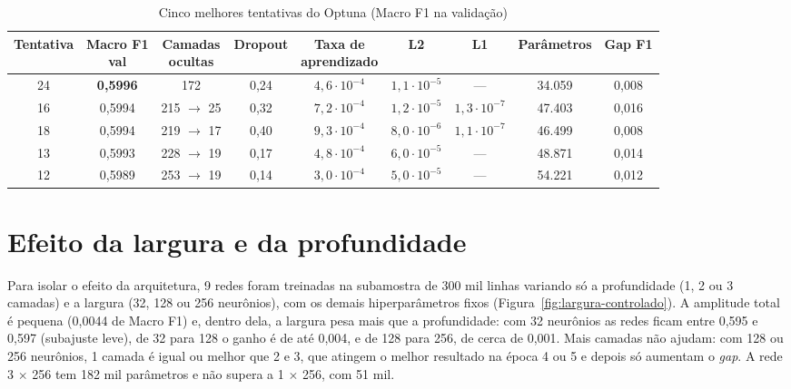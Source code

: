 \begin{table}[!htbp]
\caption{Cinco melhores tentativas do Optuna (Macro F1 na validação)}
\label{tab:top5}
\begin{center}
\scriptsize
\setlength{\tabcolsep}{4pt}
\begin{tabular}{ccccccccc}
\hline
\textbf{Tentativa} & \makecell{\textbf{Macro F1}\\\textbf{val}} & \makecell{\textbf{Camadas}\\\textbf{ocultas}} & \textbf{Dropout} & \makecell{\textbf{Taxa de}\\\textbf{aprendizado}} & \textbf{L2} & \textbf{L1} & \textbf{Parâmetros} & \textbf{Gap F1} \\ \hline
24 & \textbf{0,5996} & 172 & 0,24 & $4{,}6 \cdot 10^{-4}$ & $1{,}1 \cdot 10^{-5}$ & --- & 34.059 & 0,008 \\
16 & 0,5994 & 215 $\rightarrow$ 25 & 0,32 & $7{,}2 \cdot 10^{-4}$ & $1{,}2 \cdot 10^{-5}$ & $1{,}3 \cdot 10^{-7}$ & 47.403 & 0,016 \\
18 & 0,5994 & 219 $\rightarrow$ 17 & 0,40 & $9{,}3 \cdot 10^{-4}$ & $8{,}0 \cdot 10^{-6}$ & $1{,}1 \cdot 10^{-7}$ & 46.499 & 0,008 \\
13 & 0,5993 & 228 $\rightarrow$ 19 & 0,17 & $4{,}8 \cdot 10^{-4}$ & $6{,}0 \cdot 10^{-5}$ & --- & 48.871 & 0,014 \\
12 & 0,5989 & 253 $\rightarrow$ 19 & 0,14 & $3{,}0 \cdot 10^{-4}$ & $5{,}0 \cdot 10^{-5}$ & --- & 54.221 & 0,012 \\ \hline
\end{tabular}
\end{center}
\end{table}

\section{Efeito da largura e da profundidade}
\label{sec:largura}

Para isolar o efeito da arquitetura, 9 redes foram treinadas na subamostra de 300 mil linhas variando só a profundidade (1, 2 ou 3 camadas) e a largura (32, 128 ou 256 neurônios), com os demais hiperparâmetros fixos (Figura~\ref{fig:largura-controlado}). A amplitude total é pequena (0,0044 de Macro F1) e, dentro dela, a largura pesa mais que a profundidade: com 32 neurônios as redes ficam entre 0,595 e 0,597 (subajuste leve), de 32 para 128 o ganho é de até 0,004, e de 128 para 256, de cerca de 0,001. Mais camadas não ajudam: com 128 ou 256 neurônios, 1 camada é igual ou melhor que 2 e 3, que atingem o melhor resultado na época 4 ou 5 e depois só aumentam o \textit{gap}. A rede 3 $\times$ 256 tem 182 mil parâmetros e não supera a 1 $\times$ 256, com 51 mil.

